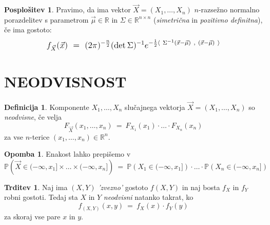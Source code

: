 \documentclass[11pt]{article}
\newcommand{\1}{\mathbbm{1}}
\theoremstyle{definition}
\newtheorem{definicija}{Definicija}[section]
\theoremstyle{definition}
\newtheorem{trditev}{Trditev}[section]
\theoremstyle{definition}
\newtheorem*{opomba}{Opomba}
\newtheorem*{posplošitev}{Posplošitev}
\begin{document}
\begin{posplošitev}

Pravimo, da ima vektor $\vec{X} = (X_1, \ldots, X_n)$ $n$-razsežno normalno porazdelitev s parametrom $\vec{\mu} \in \mathbb{R}$ in $\Sigma \in \mathbb{R}^{n \times n}$ (\textit{simetrična} in \textit{pozitivno definitna}), če ima gostoto:
$$\mathlarger{f_{\vec{X}}(\vec{x}) ~=~ (2\pi)^{-\frac{n}{2}} (\det{\Sigma})^{-1} e^{-\frac{1}{2} \langle~ \Sigma^{-1}(\vec{x} - \vec{\mu})~, ~(\vec{x} - \vec{\mu}) ~\rangle}}$$ 

\end{posplošitev}
\vspace{0.5cm}

\pagebreak


\section{NEODVISNOST}
\vspace{0.5cm}

\begin{definicija}

Komponente $X_1, \ldots, X_n$ slučajnega vektorja $\vec{X} = (X_1, \ldots, X_n)$ so \textit{neodvisne}, če velja
$$F_{\vec{X}}(x_1, \ldots, x_n) ~=~ F_{X_1}(x_1) \cdot \ldots \cdot F_{X_n}(x_n)$$
za vse $n$-terice $(x_1, \ldots, x_n) \in \mathbb{R}^n$.

\end{definicija}
\vspace{0.5cm}

\begin{opomba}

Enakost lahko prepišemo v 
$$\mathbb{P} \left( \vec{X} \in (-\infty, x_1] \times \ldots \times (-\infty, x_n] \right) ~=~ \mathbb{P} \left( X_1 \in (-\infty, x_1] \right) \cdot \ldots \cdot \mathbb{P} \left( X_n \in (-\infty, x_n] \right)$$

\end{opomba}
\vspace{0.5cm}

\begin{trditev}

Naj ima $(X, Y)$ \textit{'zvezno'} gostoto $f(X, Y)$ in naj bosta $f_X$ in $f_Y$ robni gostoti. Tedaj sta $X$ in $Y$ \textit{neodvisni} natanko takrat, ko 
$$f_{(X, Y)}(x, y) ~=~ f_X(x) \cdot f_Y(y)$$
za skoraj vse pare $x$ in $y$.

\end{trditev}
\vspace{0.5cm}
\end{document}
